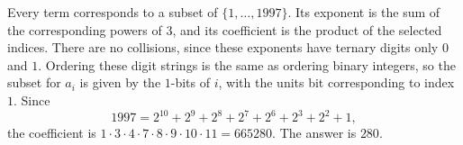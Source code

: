 Every term corresponds to a subset of $\{1,\ldots,1997\}$. Its exponent is the sum of the corresponding powers of $3$, and its coefficient is the product of the selected indices. There are no collisions, since these exponents have ternary digits only $0$ and $1$. Ordering these digit strings is the same as ordering binary integers, so the subset for $a_i$ is given by the $1$-bits of $i$, with the units bit corresponding to index $1$. Since
\[
1997=2^{10}+2^9+2^8+2^7+2^6+2^3+2^2+1,
\]
the coefficient is $1\cdot3\cdot4\cdot7\cdot8\cdot9\cdot10\cdot11=665280$. The answer is $\boxed{280}$.
